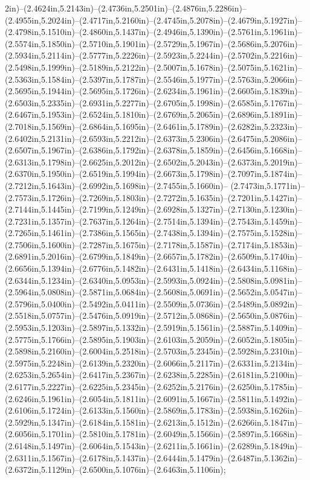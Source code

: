 2in)--(2.4624in,5.2143in)--(2.4736in,5.2501in)--(2.4876in,5.2286in)--(2.4955in,5.2024in)--(2.4717in,5.2160in)--(2.4745in,5.2078in)--(2.4679in,5.1927in)--(2.4798in,5.1510in)--(2.4860in,5.1437in)--(2.4946in,5.1390in)--(2.5761in,5.1961in)--(2.5574in,5.1850in)--(2.5710in,5.1901in)--(2.5729in,5.1967in)--(2.5686in,5.2076in)--(2.5934in,5.2114in)--(2.5777in,5.2226in)--(2.5923in,5.2244in)--(2.5702in,5.2216in)--(2.5498in,5.1999in)--(2.5189in,5.2122in)--(2.5007in,5.1678in)--(2.5075in,5.1621in)--(2.5363in,5.1584in)--(2.5397in,5.1787in)--(2.5546in,5.1977in)--(2.5763in,5.2066in)--(2.5695in,5.1944in)--(2.5695in,5.1726in)--(2.6234in,5.1961in)--(2.6605in,5.1839in)--(2.6503in,5.2335in)--(2.6931in,5.2277in)--(2.6705in,5.1998in)--(2.6585in,5.1767in)--(2.6467in,5.1953in)--(2.6524in,5.1810in)--(2.6769in,5.2065in)--(2.6896in,5.1891in)--(2.7018in,5.1569in)--(2.6864in,5.1695in)--(2.6461in,5.1789in)--(2.6282in,5.2323in)--(2.6402in,5.2131in)--(2.6593in,5.2212in)--(2.6373in,5.2306in)--(2.6475in,5.2086in)--(2.6507in,5.1967in)--(2.6386in,5.1792in)--(2.6378in,5.1859in)--(2.6456in,5.1668in)--(2.6313in,5.1798in)--(2.6625in,5.2012in)--(2.6502in,5.2043in)--(2.6373in,5.2019in)--(2.6370in,5.1950in)--(2.6519in,5.1994in)--(2.6673in,5.1798in)--(2.7097in,5.1874in)--(2.7212in,5.1643in)--(2.6992in,5.1698in)--(2.7455in,5.1660in)--
(2.7473in,5.1771in)--(2.7573in,5.1726in)--(2.7269in,5.1803in)--(2.7272in,5.1635in)--(2.7201in,5.1427in)--(2.7144in,5.1445in)--(2.7199in,5.1249in)--(2.6928in,5.1327in)--(2.7130in,5.1230in)--(2.7231in,5.1357in)--(2.7637in,5.1264in)--(2.7514in,5.1394in)--(2.7543in,5.1459in)--(2.7265in,5.1461in)--(2.7386in,5.1565in)--(2.7438in,5.1394in)--(2.7575in,5.1528in)--(2.7506in,5.1600in)--(2.7287in,5.1675in)--(2.7178in,5.1587in)--(2.7174in,5.1853in)--(2.6891in,5.2016in)--(2.6799in,5.1849in)--(2.6657in,5.1782in)--(2.6509in,5.1740in)--(2.6656in,5.1394in)--(2.6776in,5.1482in)--(2.6431in,5.1418in)--(2.6434in,5.1168in)--(2.6344in,5.1234in)--(2.6340in,5.0953in)--(2.5993in,5.0924in)--(2.5808in,5.0981in)--(2.5964in,5.0808in)--(2.5871in,5.0684in)--(2.5608in,5.0691in)--(2.5652in,5.0547in)--(2.5796in,5.0400in)--(2.5492in,5.0411in)--(2.5509in,5.0736in)--(2.5489in,5.0892in)--(2.5518in,5.0757in)--(2.5476in,5.0919in)--(2.5712in,5.0868in)--(2.5650in,5.0876in)--(2.5953in,5.1203in)--(2.5897in,5.1332in)--(2.5919in,5.1561in)--(2.5887in,5.1409in)--(2.5775in,5.1766in)--(2.5895in,5.1903in)--(2.6103in,5.2059in)--(2.6052in,5.1805in)--(2.5898in,5.2160in)--(2.6004in,5.2518in)--(2.5703in,5.2345in)--(2.5928in,5.2310in)--(2.5975in,5.2248in)--(2.6139in,5.2320in)--(2.6066in,5.2117in)--(2.6331in,5.2134in)--(2.6253in,5.2654in)--(2.6417in,5.2367in)--(2.6238in,5.2285in)--(2.6181in,5.2100in)--(2.6177in,5.2227in)--(2.6225in,5.2345in)--(2.6252in,5.2176in)--(2.6250in,5.1785in)--(2.6246in,5.1961in)--(2.6054in,5.1811in)--(2.6091in,5.1667in)--(2.5811in,5.1492in)--(2.6106in,5.1724in)--(2.6133in,5.1560in)--(2.5869in,5.1783in)--(2.5938in,5.1626in)--(2.5929in,5.1347in)--(2.6184in,5.1581in)--(2.6213in,5.1512in)--(2.6266in,5.1847in)--(2.6056in,5.1701in)--(2.5810in,5.1781in)--(2.6049in,5.1566in)--(2.5897in,5.1668in)--(2.6148in,5.1497in)--(2.6064in,5.1543in)--(2.6211in,5.1661in)--(2.6289in,5.1849in)--(2.6311in,5.1567in)--(2.6178in,5.1437in)--(2.6444in,5.1479in)--(2.6487in,5.1362in)--(2.6372in,5.1129in)--(2.6500in,5.1076in)--(2.6463in,5.1106in);
